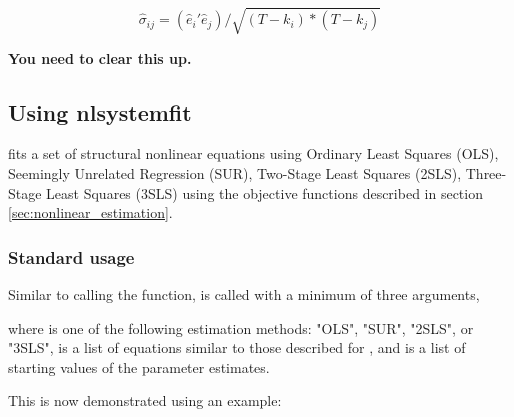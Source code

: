 \documentclass[article]{jss}
\begin{document}
\begin{equation}
  \label{eq:non-linear_varcov}
  \hat{\sigma}_{ij} = (\hat{e}_i' \hat{e}_j) / \sqrt{(T - k_i)*(T- k_j)} 
\end{equation}

\textbf{You need to clear this up.}

\subsection{Using nlsystemfit}\label{sec:UsingnlSystemfit}

 fits a set of structural nonlinear equations using
Ordinary Least Squares (OLS), Seemingly Unrelated Regression (SUR),
Two-Stage Least Squares (2SLS), Three-Stage Least Squares (3SLS) using
the objective functions described in section
\ref{sec:nonlinear_estimation}.

\subsubsection{Standard usage}

Similar to calling the  function, 
is called with a minimum of three arguments,


where  is one of the following estimation methods: "OLS",
"SUR", "2SLS", or "3SLS",  is a list of equations similar
to those described for , and  is a list of
starting values of the parameter estimates.


This is now demonstrated using an example: \\
\end{document}
